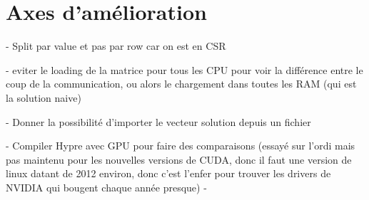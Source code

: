 \documentclass[10pt,twocolumn,letterpaper]{article}
\begin{document}
\section*{Axes d'amélioration}
- Split par value et pas par row car on est en CSR

- eviter le loading de la matrice pour tous les CPU pour voir la
différence entre le coup de la communication, ou alors le chargement dans toutes les RAM (qui 
est la solution naive)

- Donner la possibilité d'importer le vecteur solution depuis un fichier

- Compiler Hypre avec GPU pour faire des comparaisons (essayé sur l'ordi mais 
pas maintenu pour les nouvelles versions de CUDA, donc il faut une version de
linux datant de 2012 environ, donc c'est l'enfer pour trouver les drivers de NVIDIA
qui bougent chaque année presque)
-

\end{document}

